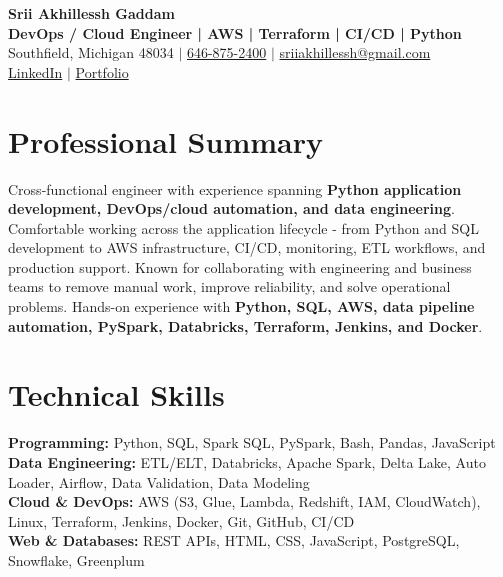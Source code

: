 \documentclass[letterpaper,10pt]{article}
\begin{document}
\fontsize{9.35pt}{10.45pt}\selectfont

\begin{center}
    {\LARGE \textbf{Srii Akhillessh Gaddam}} \\[-1pt]
    \textbf{DevOps / Cloud Engineer | AWS | Terraform | CI/CD | Python} \\[2pt]
    Southfield, Michigan 48034 $|$
    \href{tel:6468752400}{646-875-2400} $|$
    \href{mailto:sriiakhillessh@gmail.com}{sriiakhillessh@gmail.com} \\[1pt]
    \href{https://www.linkedin.com/in/srii-akhiilessh-gaddam-b48668191/}{LinkedIn} $|$
    \href{https://sriiakhillesshg.github.io/portfolio/}{Portfolio}
\end{center}
\vspace{-8pt}

\section{Professional Summary}
\small{Cross-functional engineer with experience spanning \textbf{Python application development, DevOps/cloud automation, and data engineering}. Comfortable working across the application lifecycle - from Python and SQL development to AWS infrastructure, CI/CD, monitoring, ETL workflows, and production support. Known for collaborating with engineering and business teams to remove manual work, improve reliability, and solve operational problems. Hands-on experience with \textbf{Python, SQL, AWS, data pipeline automation, PySpark, Databricks, Terraform, Jenkins, and Docker}.}

\section{Technical Skills}
\small{
\textbf{Programming:} Python, SQL, Spark SQL, PySpark, Bash, Pandas, JavaScript \\
\textbf{Data Engineering:} ETL/ELT, Databricks, Apache Spark, Delta Lake, Auto Loader, Airflow, Data Validation, Data Modeling \\
\textbf{Cloud \& DevOps:} AWS (S3, Glue, Lambda, Redshift, IAM, CloudWatch), Linux, Terraform, Jenkins, Docker, Git, GitHub, CI/CD \\
\textbf{Web \& Databases:} REST APIs, HTML, CSS, JavaScript, PostgreSQL, Snowflake, Greenplum
}
\end{document}
